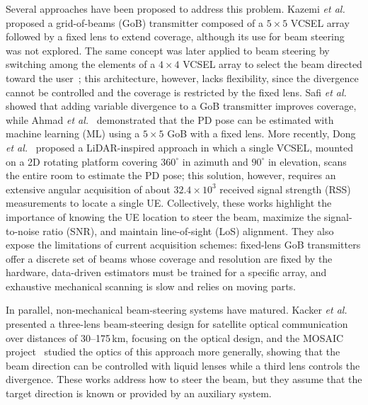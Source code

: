 \documentclass[journal]{IEEEtran}
\begin{document}
Several approaches have been proposed to address this problem. Kazemi
\emph{et al.}~\cite{Kazemi_GoB} proposed a grid-of-beams (GoB) transmitter
composed of a $5\times5$ VCSEL array followed by a fixed lens to extend
coverage, although its use for beam steering was not explored. The same
concept was later applied to beam steering by switching among the
elements of a $4\times4$ VCSEL array to select the beam directed toward
the user~\cite{Muller2025,Muller2026}; this architecture, however, lacks
flexibility, since the divergence cannot be controlled and the coverage is
restricted by the fixed lens. Safi \emph{et al.}~\cite{Safi_VarDiv}
showed that adding variable divergence to a GoB transmitter improves
coverage, while Ahmad \emph{et al.}~\cite{Rizwana_GoB} demonstrated that
the PD pose can be estimated with machine learning (ML) using a $5\times5$
GoB with a fixed lens. More recently, Dong \emph{et al.}~\cite{Dong_Scan}
proposed a LiDAR-inspired approach in which a single VCSEL, mounted on a
2D rotating platform covering $360^\circ$ in azimuth and $90^\circ$ in
elevation, scans the entire room to estimate the PD pose; this solution,
however, requires an extensive angular acquisition of about
$32.4\times10^{3}$ received signal strength (RSS) measurements to locate a
single UE. Collectively, these works highlight the importance of knowing
the UE location to steer the beam, maximize the signal-to-noise ratio
(SNR), and maintain line-of-sight (LoS) alignment. They also expose the
limitations of current acquisition schemes: fixed-lens GoB transmitters
offer a discrete set of beams whose coverage and resolution are fixed by
the hardware, data-driven estimators must be trained for a specific
array, and exhaustive mechanical scanning is slow and relies on moving
parts.

In parallel, non-mechanical beam-steering systems have matured. Kacker
\emph{et al.}~\cite{Kacker_3lens} presented a three-lens beam-steering
design for satellite optical communication over distances of
30--175\,km, focusing on the optical design, and the MOSAIC
project~\cite{MOSAIC} studied the optics of this approach more generally,
showing that the beam direction can be controlled with liquid lenses
while a third lens controls the divergence. These works address
how to steer the beam, but they assume that the target direction
is known or provided by an auxiliary system.
\end{document}
